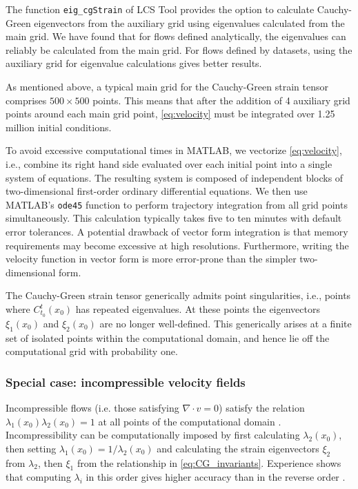 \documentclass{elsarticle}
\begin{document}
The function \lstinline!eig_cgStrain! of LCS Tool provides the option to calculate Cauchy-Green eigenvectors from the auxiliary grid using eigenvalues calculated from the main grid. We have found that for flows defined analytically, the eigenvalues can reliably be calculated from the main grid. For flows defined by datasets, using the auxiliary grid for eigenvalue calculations gives better results.

As mentioned above, a typical main grid for the Cauchy-Green strain tensor comprises $500 \times 500$ points. This means that after the addition of 4 auxiliary grid points around each main grid point, \cref{eq:velocity} must be integrated over 1.25 million initial conditions.

To avoid excessive computational times in MATLAB, we vectorize \cref{eq:velocity}, i.e., combine its right hand side evaluated over each initial point into a single system of equations. The resulting system is composed of independent blocks of two-dimensional first-order ordinary differential equations. We then use MATLAB's \lstinline!ode45! function to perform trajectory integration from all grid points simultaneously. This calculation typically takes five to ten minutes with default error tolerances.
A potential drawback of vector form integration is that memory requirements may become excessive at high resolutions. Furthermore, writing the velocity function in vector form is more error-prone than the simpler two-dimensional form.

The Cauchy-Green strain tensor generically admits point singularities, i.e., points where $C_{t_0}^t(x_0)$ has repeated eigenvalues. At these points the eigenvectors $\xi_1(x_0)$ and $\xi_2(x_0)$ are no longer well-defined. This generically arises at a finite set of isolated points within the computational domain\citep{delmarcelle94}, and hence lie off the computational grid with probability one.

\subsubsection{Special case: incompressible velocity fields}

Incompressible flows (i.e. those satisfying $\nabla \cdot v=0$) satisfy the relation $\lambda_1(x_0) \lambda_2(x_0) = 1$ at all points of the computational domain \citep{arnold78:_mathem}. Incompressibility can be computationally imposed by first calculating $\lambda_2(x_0)$, then setting $\lambda_1(x_0) = 1/\lambda_2(x_0)$ and calculating the strain eigenvectors $\xi_2$ from $\lambda_2$, then $\xi_1$ from the relationship in \cref{eq:CG_invariants}. Experience shows that computing $\lambda_i$ in this order gives higher accuracy than in the reverse order \citep{farazmand12:_comput_lagran}.
\end{document}
